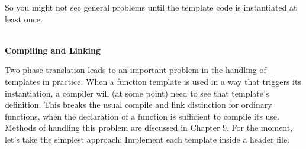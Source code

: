 So you might not see general problems until the template code is instantiated at least once.

\hspace*{\fill} \\ %
\noindent
\textbf{Compiling and Linking}

Two-phase translation leads to an important problem in the handling of templates in practice: When a function template is used in a way that triggers its instantiation, a compiler will (at some point) need to see that template’s definition. This breaks the usual compile and link distinction for ordinary functions, when the declaration of a function is sufficient to compile its use. Methods of handling this problem are discussed in Chapter 9. For the moment, let’s take the simplest approach: Implement each template inside a header file.








